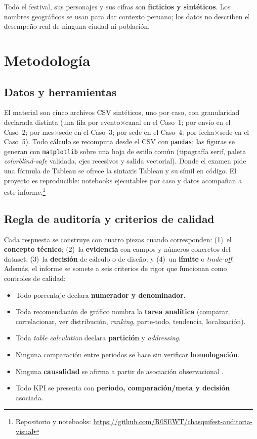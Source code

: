 \documentclass[12pt,a4paper]{article}
\begin{document}
Todo el festival, sus personajes y sus cifras son \textbf{ficticios y sintéticos}. Los nombres geográficos se usan para dar contexto peruano; los datos no describen el desempeño real de ninguna ciudad ni población.

\section{Metodología}

\subsection{Datos y herramientas}
El material son cinco archivos CSV sintéticos, uno por caso, con granularidad declarada distinta (una fila por evento$\times$canal en el Caso~1; por envío en el Caso~2; por mes$\times$sede en el Caso~3; por sede en el Caso~4; por fecha$\times$sede en el Caso~5). Todo cálculo se recomputa desde el CSV con \texttt{pandas}; las figuras se generan con \texttt{matplotlib} sobre una hoja de estilo común (tipografía serif, paleta \emph{colorblind-safe} validada, ejes recesivos y salida vectorial). Donde el examen pide una fórmula de Tableau se ofrece la sintaxis Tableau y su símil en código. El proyecto es reproducible: notebooks ejecutables por caso y datos acompañan a este informe.\footnote{Repositorio y notebooks: \url{https://github.com/R0SEWT/chasquifest-auditoria-visual}}

\subsection{Regla de auditoría y criterios de calidad}
Cada respuesta se construye con cuatro piezas cuando corresponden: (1)~el \textbf{concepto técnico}; (2)~la \textbf{evidencia} con campos y números concretos del dataset; (3)~la \textbf{decisión} de cálculo o de diseño; y (4)~un \textbf{límite} o \emph{trade-off}. Además, el informe se somete a seis criterios de rigor que funcionan como controles de calidad:

\begin{itemize}
  \item Todo porcentaje declara \textbf{numerador y denominador}.
  \item Toda recomendación de gráfico nombra la \textbf{tarea analítica} (comparar, correlacionar, ver distribución, \emph{ranking}, parte-todo, tendencia, localización).
  \item Toda \emph{table calculation} declara \textbf{partición} y \emph{addressing}.
  \item Ninguna comparación entre periodos se hace sin verificar \textbf{homologación}.
  \item Ninguna \textbf{causalidad} se afirma a partir de asociación observacional \citep{simpson1951interpretation,anscombe1973graphs}.
  \item Todo KPI se presenta con \textbf{periodo, comparación/meta y decisión} asociada.
\end{itemize}
\end{document}
